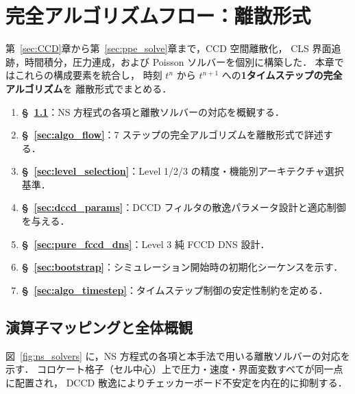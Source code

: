
\section{完全アルゴリズムフロー：離散形式}
\label{sec:algorithm}

第~\ref{sec:CCD}章から第~\ref{sec:ppe_solve}章まで，CCD 空間離散化，
CLS 界面追跡，時間積分，圧力連成，および Poisson ソルバーを個別に構築した．
本章ではこれらの構成要素を統合し，
時刻 $t^n$ から $t^{n+1}$ への\textbf{1タイムステップの完全アルゴリズム}を
離散形式でまとめる．

\begin{enumerate}
  \item \textbf{§~\ref{sec:algo_operator_map}}：NS 方程式の各項と離散ソルバーの対応を概観する．
  \item \textbf{§~\ref{sec:algo_flow}}：7 ステップの完全アルゴリズムを離散形式で詳述する．
  \item \textbf{§~\ref{sec:level_selection}}：Level 1/2/3 の精度・機能別アーキテクチャ選択基準．
  \item \textbf{§~\ref{sec:dccd_params}}：DCCD フィルタの散逸パラメータ設計と適応制御を与える．
  \item \textbf{§~\ref{sec:pure_fccd_dns}}：Level 3 純 FCCD DNS 設計．
  \item \textbf{§~\ref{sec:bootstrap}}：シミュレーション開始時の初期化シーケンスを示す．
  \item \textbf{§~\ref{sec:algo_timestep}}：タイムステップ制御の安定性制約を定める．
\end{enumerate}

\subsection{演算子マッピングと全体概観}
\label{sec:algo_operator_map}

図~\ref{fig:ns_solvers} に，NS 方程式の各項と本手法で用いる離散ソルバーの対応を示す．
コロケート格子（セル中心）上で圧力・速度・界面変数すべてが同一点に配置され，
DCCD 散逸によりチェッカーボード不安定を内在的に抑制する．

